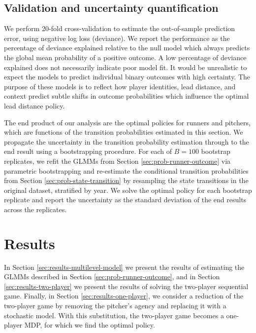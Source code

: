 \documentclass[aoas]{imsart}
\begin{document}
    \subsection{Validation and uncertainty quantification}

      We perform 20-fold cross-validation to estimate the out-of-sample prediction error, using negative log loss (deviance). We report the performance as the percentage of deviance explained relative to the null model which always predicts the global mean probability of a positive outcome. A low percentage of deviance explained does not necessarily indicate poor model fit. It would be unrealistic to expect the models to predict individual binary outcomes with high certainty. The purpose of these models is to reflect how player identities, lead distance, and context predict subtle shifts in outcome probabilities which influence the optimal lead distance policy.

      The end product of our analysis are the optimal policies for runners and pitchers, which are functions of the transition probabilities estimated in this section. We propagate the uncertainty in the transition probability estimation through to the end result using a bootstrapping procedure. For each of $B = 100$ bootstrap replicates, we refit the GLMMs from Section \ref{sec:prob-runner-outcome} via parametric bootstrapping \citep{bates_fitting_2015} and re-estimate the conditional transition probabilities from Section \ref{sec:prob-state-transition} by resampling the state transitions in the original dataset, stratified by year. We solve the optimal policy for each bootstrap replicate and report the uncertainty as the standard deviation of the end results across the replicates.

  \section{Results}
  \label{sec:results}

    In Section \ref{sec:results-multilevel-model} we present the results of estimating the GLMMs described in Section \ref{sec:prob-runner-outcome}, and in Section \ref{sec:results-two-player} we present the results of solving the two-player sequential game. Finally, in Section \ref{sec:results-one-player}, we consider a reduction of the two-player game by removing the pitcher's agency and replacing it with a stochastic model. With this substitution, the two-player game becomes a one-player MDP, for which we find the optimal policy.
    
\end{document}
